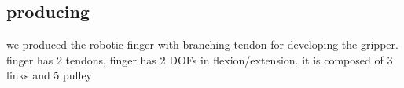 \documentclass{llncs}
\begin{document}

																																	     

	\subsection{producing} %
	\label{sub:producing}
	
we produced the robotic finger with branching tendon for developing the gripper.
finger has 2 tendons, 
finger has 2 DOFs in flexion/extension.
it is composed of 3 links and 5 pulley


\end{document}
